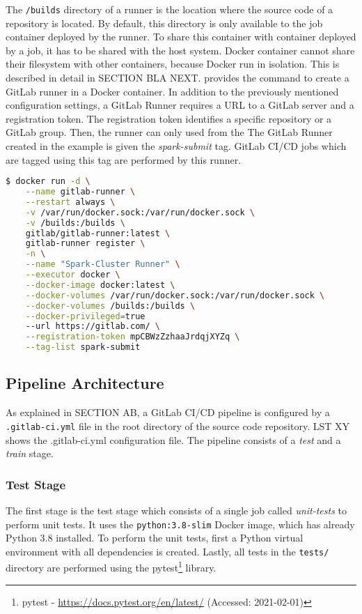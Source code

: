 The \texttt{/builds} directory of a runner is the location where the source code of a repository is located. By default, this directory is only available to the job container deployed by the runner. To share this container with container deployed by a job, it has to be shared with the host system. Docker container cannot share their filesystem with other containers, because Docker run in isolation. This is described in detail in SECTION BLA NEXT.
 provides the command to create a GitLab runner in a Docker container.
In addition to the previously mentioned configuration settings, a GitLab Runner requires a URL to a GitLab server and a registration token.
%
The registration token identifies a specific repository or a GitLab group. Then, the runner can only used from the 
%
The GitLab Runner created in the example is given the \textit{spark-submit} tag. GitLab CI/CD jobs which are tagged using this tag are performed by this runner.
\begin{lstlisting}[label=lst:06_ci_runner_container_cmd, caption=CLI command to start a GitLab runner in a Docker container, language=bash]
$ docker run -d \
    --name gitlab-runner \
    --restart always \
    -v /var/run/docker.sock:/var/run/docker.sock \
    -v /builds:/builds \
    gitlab/gitlab-runner:latest \
    gitlab-runner register \
    -n \
    --name "Spark-Cluster Runner" \
    --executor docker \
    --docker-image docker:latest \
    --docker-volumes /var/run/docker.sock:/var/run/docker.sock \
    --docker-volumes /builds:/builds \
    --docker-privileged=true
    --url https://gitlab.com/ \
    --registration-token mpCBWzZzhaaJrdqjXYZq \
    --tag-list spark-submit
\end{lstlisting}


\subsection{Pipeline Architecture}
%
As explained in SECTION AB, a GitLab CI/CD pipeline is configured by a \texttt{.gitlab-ci.yml} file in the root directory of the source code repository.
%
LST XY shows the .gitlab-ci.yml configuration file. The pipeline consists of a \textit{test} and a \textit{train} stage.


\subsubsection{Test Stage}
The first stage is the test stage which consists of a single job called \textit{unit-tests} to perform unit tests.
It uses the \texttt{python:3.8-slim} Docker image, which has already Python 3.8 installed. To perform the unit tests, first a Python virtual environment with all dependencies is created. Lastly, all tests in the \texttt{tests/} directory are performed using the pytest\footnote{pytest - \url{https://docs.pytest.org/en/latest/} (Accessed: 2021-02-01)} library.


